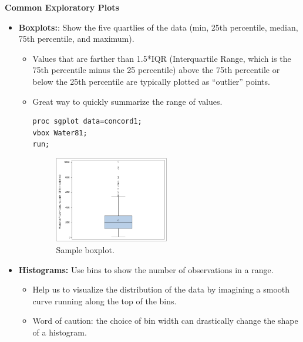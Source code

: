 \documentclass[12pt]{../notes}
\begin{document}
\textbf{Common Exploratory Plots}
\begin{itemize}
\item \textbf{Boxplots:}: Show the five quartlies of the data (min, 25th percentile, median, 75th percentile, and maximum). 
\begin{itemize}
\item Values that are farther than 1.5*IQR (Interquartile Range, which is the 75th percentile minus the 25 percentile) above the 75th percentile or below the 25th percentile are typically plotted as ``outlier'' points. 
\item Great way to quickly summarize the range of values.

\begin{verbatim}
proc sgplot data=concord1;
vbox Water81;
run;
\end{verbatim}

\begin{minipage}[l][1cm][c]{\textwidth}
\end{minipage}

\begin{figure}[H]
\centering
\includegraphics[width = 0.5\textwidth]{figures/module1/sampBox.png}
\caption{Sample boxplot.}
\end{figure}

\end{itemize}
\item \textbf{Histograms:} Use bins to show the number of observations in a range. 
\begin{itemize}
\item Help us to visualize the distribution of the data by imagining a smooth curve running along the top of the bins. 
\item Word of caution: the choice of bin width can drastically change the shape of a histogram. 
\end{itemize}


\end{itemize}
\end{document}
